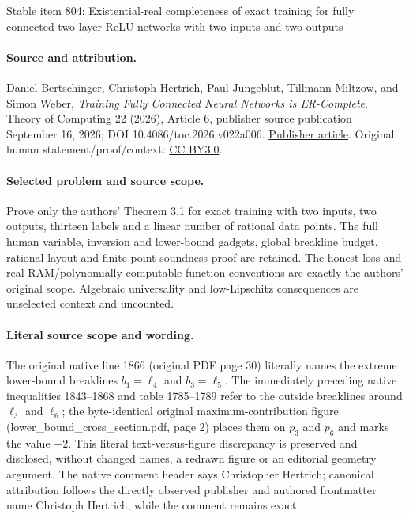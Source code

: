 \documentclass[11pt]{article}
\numberwithin{equation}{section}
\theoremstyle{definition}
\theoremstyle{plain}
\theoremstyle{plain}
\begin{document}
\begin{center}{\Large Stable item 804: Existential-real completeness of exact training for fully connected two-layer ReLU networks with two inputs and two outputs}\end{center}
\paragraph{Source and attribution.}
Daniel Bertschinger, Christoph Hertrich, Paul Jungeblut, Tillmann Miltzow, and Simon Weber, \emph{Training Fully Connected Neural Networks is ER-Complete}. Theory of Computing 22 (2026), Article 6, publisher source publication September 16, 2026; DOI 10.4086/toc.2026.v022a006. \href{https://theoryofcomputing.org/articles/v022a006/}{Publisher article}. Original human statement/proof/context: \href{https://creativecommons.org/licenses/by/3.0/}{CC BY3.0}.
\paragraph{Selected problem and source scope.}
Prove only the authors' Theorem 3.1 for exact training with two inputs, two outputs, thirteen labels and a linear number of rational data points. The full human variable, inversion and lower-bound gadgets, global breakline budget, rational layout and finite-point soundness proof are retained. The honest-loss and real-RAM/polynomially computable function conventions are exactly the authors' original scope. Algebraic universality and low-Lipschitz consequences are unselected context and uncounted.
\paragraph{Literal source scope and wording.}
The original native line 1866 (original PDF page 30) literally names the extreme lower-bound breaklines \(b_1=\ell_4\) and \(b_3=\ell_5\). The immediately preceding native inequalities 1843–1868 and table 1785–1789 refer to the outside breaklines around \(\ell_3\) and \(\ell_6\); the byte-identical original maximum-contribution figure (lower\_bound\_cross\_section.pdf, page 2) places them on \(p_3\) and \(p_6\) and marks the value \(-2\). This literal text-versus-figure discrepancy is preserved and disclosed, without changed names, a redrawn figure or an editorial geometry argument. The native comment header says Christopher Hertrich; canonical attribution follows the directly observed publisher and authored frontmatter name Christoph Hertrich, while the comment remains exact.
\end{document}
